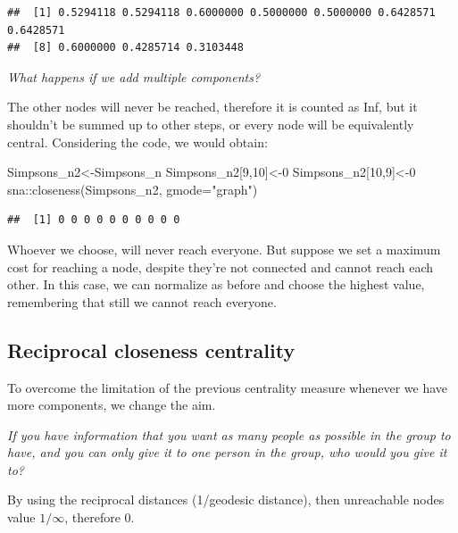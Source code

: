 \documentclass[
  notitlepage,
  onecolumn,
  openany]{book}
\newenvironment{Shaded}{\begin{snugshade}}{\end{snugshade}}
\newcommand{\AttributeTok}[1]{\textcolor[rgb]{0.77,0.63,0.00}{#1}}
\newcommand{\DecValTok}[1]{\textcolor[rgb]{0.00,0.00,0.81}{#1}}
\newcommand{\FunctionTok}[1]{\textcolor[rgb]{0.00,0.00,0.00}{#1}}
\newcommand{\NormalTok}[1]{#1}
\newcommand{\OtherTok}[1]{\textcolor[rgb]{0.56,0.35,0.01}{#1}}
\newcommand{\SpecialCharTok}[1]{\textcolor[rgb]{0.00,0.00,0.00}{#1}}
\newcommand{\StringTok}[1]{\textcolor[rgb]{0.31,0.60,0.02}{#1}}
\begin{document}
\begin{verbatim}
##  [1] 0.5294118 0.5294118 0.6000000 0.5000000 0.5000000 0.6428571 0.6428571
##  [8] 0.6000000 0.4285714 0.3103448
\end{verbatim}

\emph{What happens if we add multiple components?}

The other nodes will never be reached, therefore it is counted as Inf, but it shouldn't be summed up to other steps, or every node will be equivalently central. Considering the code, we would obtain:

\begin{Shaded}
\begin{Highlighting}[]
\NormalTok{Simpsons\_n2}\OtherTok{\textless{}{-}}\NormalTok{Simpsons\_n}
\NormalTok{Simpsons\_n2[}\DecValTok{9}\NormalTok{,}\DecValTok{10}\NormalTok{]}\OtherTok{\textless{}{-}}\DecValTok{0}
\NormalTok{Simpsons\_n2[}\DecValTok{10}\NormalTok{,}\DecValTok{9}\NormalTok{]}\OtherTok{\textless{}{-}}\DecValTok{0}
\NormalTok{sna}\SpecialCharTok{::}\FunctionTok{closeness}\NormalTok{(Simpsons\_n2, }\AttributeTok{gmode=}\StringTok{"graph"}\NormalTok{)}
\end{Highlighting}
\end{Shaded}

\begin{verbatim}
##  [1] 0 0 0 0 0 0 0 0 0 0
\end{verbatim}

Whoever we choose, will never reach everyone. But suppose we set a maximum cost for reaching a node, despite they're not connected and cannot reach each other. In this case, we can normalize as before and choose the highest value, remembering that still we cannot reach everyone.

\hypertarget{reciprocal-closeness-centrality}{%
\subsection{Reciprocal closeness centrality}\label{reciprocal-closeness-centrality}}

To overcome the limitation of the previous centrality measure whenever we have more components, we change the aim.

\emph{If you have information that you want as many people as possible in the group to have, and you can only give it to one person in the group, who would you give it to?}

By using the reciprocal distances (1/geodesic distance), then unreachable nodes value \(1/\infty\), therefore 0.
\end{document}
